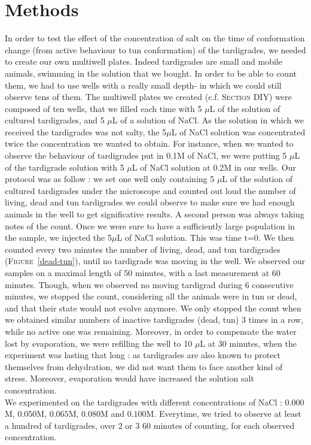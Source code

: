 \documentclass[12pt,a4paper, twocolumn]{article}
\begin{document}
\section{Methods}
In order to test the effect of the concentration of salt on the time of conformation change (from active behaviour to tun conformation) of  the tardigrades, we needed to create our own multiwell plates. Indeed tardigrades are small and mobile animals, swimming in the solution that we bought. In order to be able to count them, we had to use wells with a really small depth- in which we could still observe tens of them. The multiwell plates we created (c.f. \textsc{Section} DIY) were composed of ten wells, that we filled each time with 5 $\mu$L of the solution of cultured tardigrades, and 5 $\mu$L of a solution of NaCl. As the solution in which we received the tardigrades was not salty, the 5$\mu$L of NaCl solution was concentrated twice the concentration we wanted to obtain. For instance, when we wanted to observe the behaviour of tardigrades put in 0.1M of NaCl, we were putting  5 $\mu$L of the tardigrade solution with 5 $\mu$L of NaCl solution at 0.2M in our wells. 
Our protocol was as follow : we set one well only containing 5 $\mu$L of the solution of cultured tardigrades under the microscope and counted out loud the number of living, dead and tun tardigrades we could observe to make sure we had enough animals in the well to get significative results. A second person was always taking notes of the count. Once we were sure to have a sufficiently large population in the sample, we injected the 5$\mu$L of NaCl solution. This was time t=0. We then counted every two minutes the number of living, dead, and tun tardigrades (\textsc{Figure}~\ref{dead-tun}), until no tardigrade was moving in the well. We observed our samples on a maximal length of 50 minutes, with a last measurement at 60 minutes. Though, when we observed no moving tardigrad during 6 consecutive minutes, we stopped the count, considering all the animals were in tun or dead, and that their state would not evolve anymore. We only stopped the count when we obtained similar numbers of inactive tardigrades (dead, tun) 3 times in a row, while no active one was remaining. 
Moreover, in order to compensate the water lost by evaporation, we were refilling the well to 10 $\mu$L at 30 minutes, when the experiment was lasting that long : as tardigrades are also known to protect themselves from dehydration, we did not want them to face another kind of stress. Moreover, evaporation would have increased the solution salt concentration.\\
We experimented on the tardigrades with different concentrations of NaCl : $0.000$M, $0.050$M, $0.065$M, $0.080$M and $0.100$M. Everytime, we tried to observe at least a hundred of tardigrades, over 2 or 3 60 minutes of counting, for each observed concentration. \\
\end{document}
